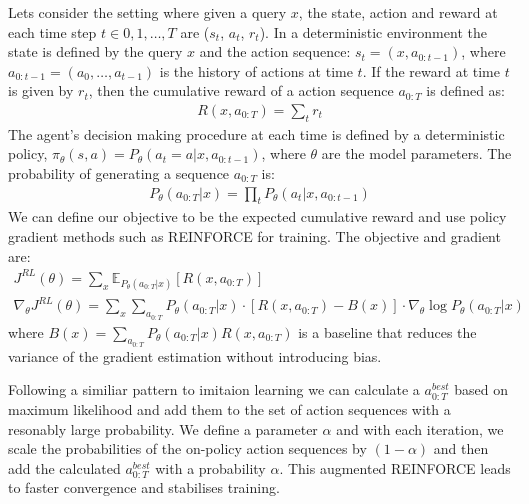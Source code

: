 Lets consider the setting where given a query $x$, the state, action and reward at each time step $t \in {0, 1, \dots, T }$ are ($s_t$, $a_t$, $r_t$). In a deterministic environment the state is defined by the query $x$ and the action sequence: $s_t = (x, a_{0:t-1})$, where $a_{0:t-1} = (a_0, \dots, a_{t-1})$ is the history of actions at time $t$. If the reward at time $t$ is given by $r_t$, then the cumulative reward of a action sequence $a_{0:T}$ is defined as:
\begin{gather}
R(x, a_{0:T}) = \sum_{t}r_t
\end{gather}
The agent’s decision making procedure at each time is defined by a deterministic policy, $\pi_\theta(s,a) = P_\theta(a_t = a|x, a_{0:t-1})$, where $\theta$ are the model parameters. The probability of generating a sequence $a_{0:T}$ is:
\begin{gather}
P_\theta(a_{0:T}|x) = \prod_{t}P_\theta(a_t|x, a_{0:t-1})
\end{gather}
We can define our objective to be the expected cumulative reward and use policy gradient methods such as REINFORCE for training. The objective and gradient are:
\begin{gather}
J^{RL}(\theta) = \sum_{x}\mathbb{E}_{P_\theta(a_{0:T}|x)}[R(x, a_{0:T})] \\
\nabla_\theta J^{RL}(\theta) = \sum_{x}\sum_{a_{0:T}}P_\theta(a_{0:T}|x)\cdot[R(x, a_{0:T}) - B(x)]\cdot\nabla_\theta \log P_\theta(a_{0:T}|x)
\end{gather}
where $B(x) = \sum\nolimits_{a_{0:T}} P_\theta(a_{0:T} | x)R(x, a_{0:T})$ is a baseline that reduces the variance of the gradient estimation without introducing bias.

Following a similiar pattern to imitaion learning \cite{ross2011reduction, berant2015imitation} we can calculate a $a^{best}_{0:T}$ based on maximum likelihood and add them to the set of action sequences with a resonably large probability. We define a parameter $\alpha$ and with each iteration, we scale the probabilities of the on-policy action sequences by $(1 - \alpha)$ and then add the calculated $a^{best}_{0:T}$ with a probability $\alpha$. This augmented REINFORCE leads to faster convergence and stabilises training.